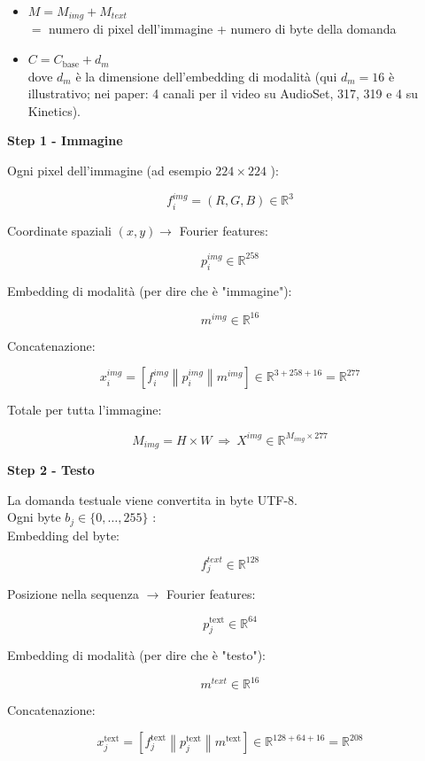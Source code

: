 \documentclass[
  11pt,
]{article}
\begin{document}
\begin{itemize}
\item
  \(M = M_{img} + M_{text}\)\\
  \(=\) numero di pixel dell'immagine + numero di byte
  della domanda
\item
  \(C = C_{\text{base}} + d_{m}\)\\
  dove \(d_{m}\) è la dimensione dell'embedding di
  modalità (qui \(d_{m} = 16\) è illustrativo; nei paper: 4 canali per il video su AudioSet, 317, 319 e 4 su Kinetics).
\end{itemize}

\textbf{Step 1 - Immagine}

Ogni pixel dell'immagine (ad esempio \(224 \times 224\)
):

\[f_{i}^{img} = (R,G,B) \in \mathbb{R}^{3}\]

Coordinate spaziali \((x,y) \rightarrow\) Fourier features:

\[p_{i}^{img} \in \mathbb{R}^{258}\]

Embedding di modalità (per dire che è "immagine"):

\[m^{img} \in \mathbb{R}^{16}\]

Concatenazione:

\[x_{i}^{img} = \left\lbrack f_{i}^{img}\left\| p_{i}^{img} \right\| m^{img} \right\rbrack \in \mathbb{R}^{3 + 258 + 16} = \mathbb{R}^{277}\]

Totale per tutta l'immagine:

\[M_{img} = H \times W\  \Rightarrow \ X^{img} \in \mathbb{R}^{M_{img} \times 277}\]

\textbf{Step 2 - Testo}

La domanda testuale viene convertita in byte UTF-8.\\
Ogni byte \(b_{j} \in \{ 0,\ldots,255\}\) :\\
Embedding del byte:

\[f_{j}^{text} \in \mathbb{R}^{128}\]

Posizione nella sequenza \(\rightarrow\) Fourier features:

\[p_{j}^{\text{text}} \in \mathbb{R}^{64}\]

Embedding di modalità (per dire che è "testo"):

\[m^{text} \in \mathbb{R}^{16}\]

Concatenazione:

\[x_{j}^{\text{text}} = \left\lbrack f_{j}^{\text{text}}\left\| p_{j}^{\text{text}} \right\| m^{\text{text}} \right\rbrack \in \mathbb{R}^{128 + 64 + 16} = \mathbb{R}^{208}\]
\end{document}
